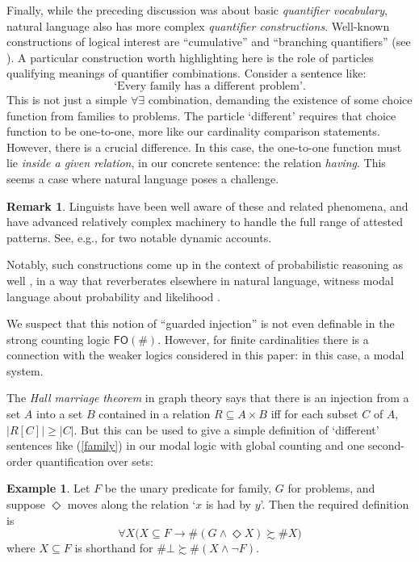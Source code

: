 \documentclass[12pt,oneside,reqno]{amsart}
\theoremstyle{definition}
\newtheorem{example}{Example}
\newtheorem{remark}{Remark}
\begin{document}
Finally, while the preceding discussion was about basic \emph{quantifier vocabulary},  natural language also has more complex \emph{quantifier constructions}. Well-known constructions of logical interest are ``cumulative'' and ``branching quantifiers'' (see \citealt{PetersWesterstahl}). A particular construction worth highlighting here is the role of particles qualifying meanings of quantifier combinations. Consider a sentence like:
\begin{equation} \label{family} \mbox{`Every family has a different problem'.} \end{equation}
This is not just a simple $\forall\exists$ combination,  demanding the existence of some choice function from families to problems. The particle `different' requires that choice function to be one-to-one, more like our cardinality comparison statements. However, there is a crucial difference. In this case, the one-to-one function must lie {\it inside a given relation}, in our concrete sentence: the relation \emph{having}. This seems a case where natural language poses a challenge.
\begin{remark} Linguists have been well aware of these and related phenomena, and have advanced relatively complex machinery to handle the full range of attested patterns. See, e.g., \cite{Brasoveanu,Bumford} for two notable dynamic accounts.

Notably, such constructions come up in the context of probabilistic reasoning as well \citep{HHI2016}, in a way that reverberates elsewhere in natural language, witness modal language about  probability and likelihood \citep{HIForthcoming}. \end{remark} We suspect that this notion of ``guarded injection'' is not even definable in the strong counting logic  $\mathsf{FO}(\#)$. However, for finite cardinalities there is a connection with the weaker logics considered in this paper: in this case, a modal system.

The  \emph{Hall marriage theorem} in graph theory \citep{Hall} says that there is an injection from a  set $A$ into a set $B$ contained in a relation $R \subseteq A \times B$ iff for each subset $C$ of $A$, $|R[C]| \geq |C|$. But this can be used to give a simple definition of `different' sentences like (\ref{family}) in our modal logic with global counting and one second-order quantification over sets: 
\begin{example}
Let $F$ be the unary predicate for family, $G$ for problems, and suppose $\Diamond$ moves along the relation `$x$ is had by $y$'. Then the required definition is\begin{equation*}
    \forall X \big(X \subseteq F \rightarrow \# (G \wedge \Diamond X) \succsim \# X\big)
\end{equation*} 
where $X \subseteq F$ is shorthand for $\#\bot \succsim \#(X \wedge \neg F)$. \label{ex:problems}\end{example}
\end{document}
